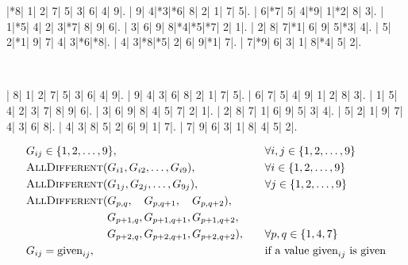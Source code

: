 \documentclass{cons-beamer}
\begin{document}
\begin{frame}[fragile]
  \begin{center}
    \vspace{2mm}
    \PuzzleUnitlength=11pt
    \renewcommand*\SudokuLinethickness{1pt}
    \renewcommand*\PuzzleFont{\sf\tiny}
    \begin{Sudoku}
      |*8| 1| 2| 7| 5| 3| 6| 4| 9|.
      | 9| 4|*3|*6| 8| 2| 1| 7| 5|.
      | 6|*7| 5| 4|*9| 1|*2| 8| 3|.
      | 1|*5| 4| 2| 3|*7| 8| 9| 6|.
      | 3| 6| 9| 8|*4|*5|*7| 2| 1|.
      | 2| 8| 7|*1| 6| 9| 5|*3| 4|.
      | 5| 2|*1| 9| 7| 4| 3|*6|*8|.
      | 4| 3|*8|*5| 2| 6| 9|*1| 7|.
      | 7|*9| 6| 3| 1| 8|*4| 5| 2|.
    \end{Sudoku}
    ~~~~~
    \PuzzleSolution
    \begin{Sudoku}
      | 8| 1| 2| 7| 5| 3| 6| 4| 9|.
      | 9| 4| 3| 6| 8| 2| 1| 7| 5|.
      | 6| 7| 5| 4| 9| 1| 2| 8| 3|.
      | 1| 5| 4| 2| 3| 7| 8| 9| 6|.
      | 3| 6| 9| 8| 4| 5| 7| 2| 1|.
      | 2| 8| 7| 1| 6| 9| 5| 3| 4|.
      | 5| 2| 1| 9| 7| 4| 3| 6| 8|.
      | 4| 3| 8| 5| 2| 6| 9| 1| 7|.
      | 7| 9| 6| 3| 1| 8| 4| 5| 2|.
    \end{Sudoku}
  \end{center}
  \begin{example}
    \footnotesize
    \vspace{-1em}
    \begin{align*}
      &G_{ij} \in \{1, 2, \dots, 9\}, \quad &&\forall i, j \in \{1, 2, \dots, 9\} \\ %
      &\cons{AllDifferent}{G_{i1}, G_{i2}, \dots, G_{i9}}, \quad &&\forall i \in \{1, 2, \dots, 9\} \\ %
      &\cons{AllDifferent}{G_{1j}, G_{2j}, \dots, G_{9j}}, \quad &&\forall j \in \{1, 2, \dots, 9\} \\ 
      &\cons{AllDifferent}{G_{p, q}, ~~~G_{p, q+1}, ~~~G_{p, q+2}}, && \notag \\
      &\qquad \qquad \qquad \quad ~G_{p+1, q}, G_{p+1, q+1}, G_{p+1, q+2}, && \notag \\
      &\qquad \qquad \qquad \quad ~G_{p+2, q}, G_{p+2, q+1}, G_{p+2, q+2}), \quad &&\forall p, q \in \{1, 4, 7\} \\ 
      &G_{ij} = \mbox{given}_{ij}, \quad &&\text{if a value } \mbox{given}_{ij} \text{ is given} 
    \end{align*}
  \end{example}
\end{frame}
\end{document}
